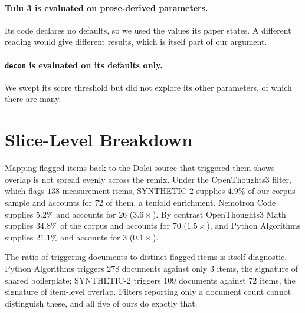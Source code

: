 \documentclass[11pt]{article}
\begin{document}
\paragraph{Tulu 3 is evaluated on prose-derived parameters.} Its code declares no
defaults, so we used the values its paper states. A different reading would give
different results, which is itself part of our argument.

\paragraph{\texttt{decon} is evaluated on its defaults only.} We swept its score
threshold but did not explore its other parameters, of which there are many.




\appendix

\section{Slice-Level Breakdown}
\label{sec:composition}

Mapping flagged items back to the Dolci source that triggered them shows overlap
is not spread evenly across the remix. Under the OpenThoughts3 filter, which flags
$138$ measurement items, SYNTHETIC-2 supplies $4.9\%$ of our corpus sample and
accounts for $72$ of them, a tenfold enrichment. Nemotron Code supplies $5.2\%$
and accounts for $26$ ($3.6\times$). By contrast OpenThoughts3 Math supplies
$34.8\%$ of the corpus and accounts for $70$ ($1.5\times$), and Python Algorithms
supplies $21.1\%$ and accounts for $3$ ($0.1\times$).

The ratio of triggering documents to distinct flagged items is itself diagnostic.
Python Algorithms triggers $278$ documents against only $3$ items, the signature of
shared boilerplate; SYNTHETIC-2 triggers $109$ documents against $72$ items, the
signature of item-level overlap. Filters reporting only a document count cannot
distinguish these, and all five of ours do exactly that.

\label{app:slices}
\end{document}
